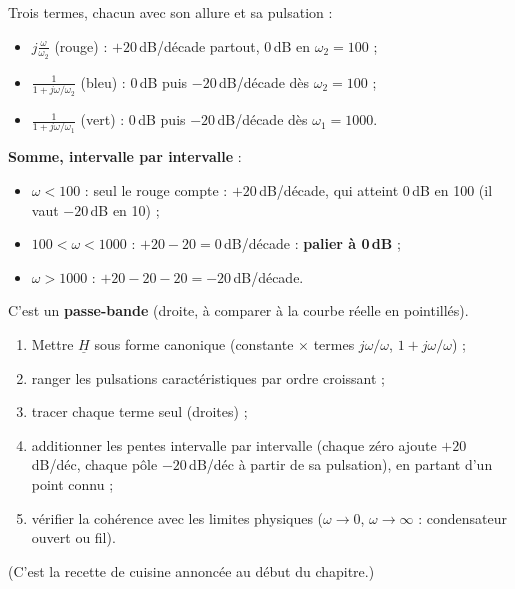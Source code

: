 \begin{exbox}[title={$\underline H(j\omega) = \frac{j\frac\omega{\omega_2}}{\left(1 + j\frac\omega{\omega_1}\right)\left(1 + j\frac\omega{\omega_2}\right)}$, $\omega_2 = 10^2$, $\omega_1 = 10^3$ rad/s}]
Trois termes, chacun avec son allure et sa pulsation :
\begin{itemize}
  \item $j\frac\omega{\omega_2}$ (rouge) : $+20$\,dB/décade partout, 0\,dB en
        $\omega_2 = 100$ ;
  \item $\frac1{1 + j\omega/\omega_2}$ (bleu) : 0\,dB puis $-20$\,dB/décade dès
        $\omega_2 = 100$ ;
  \item $\frac1{1 + j\omega/\omega_1}$ (vert) : 0\,dB puis $-20$\,dB/décade dès
        $\omega_1 = 1000$.
\end{itemize}
\textbf{Somme, intervalle par intervalle} :
\begin{itemize}
  \item $\omega < 100$ : seul le rouge compte : $+20$\,dB/décade, qui atteint 0\,dB en 100
        (il vaut $-20$\,dB en 10) ;
  \item $100 < \omega < 1000$ : $+20 - 20 = 0$\,dB/décade : \textbf{palier à 0\,dB} ;
  \item $\omega > 1000$ : $+20 - 20 - 20 = -20$\,dB/décade.
\end{itemize}
C'est un \textbf{passe-bande} (droite, à comparer à la courbe réelle en pointillés).
\end{exbox}

\begin{exbox}[title={Recette pour tracer le module}]
\begin{enumerate}
  \item Mettre $\underline H$ sous forme canonique (constante $\times$ termes $j\omega/\omega$,
        $1 + j\omega/\omega$) ;
  \item ranger les pulsations caractéristiques par ordre croissant ;
  \item tracer chaque terme seul (droites) ;
  \item additionner les pentes intervalle par intervalle (chaque zéro ajoute $+20$\,dB/déc,
        chaque pôle $-20$\,dB/déc à partir de sa pulsation), en partant d'un point connu ;
  \item vérifier la cohérence avec les limites physiques ($\omega\to0$, $\omega\to\infty$ :
        condensateur ouvert ou fil).
\end{enumerate}
(C'est la \og recette de cuisine\fg{} annoncée au début du chapitre.)
\end{exbox}

